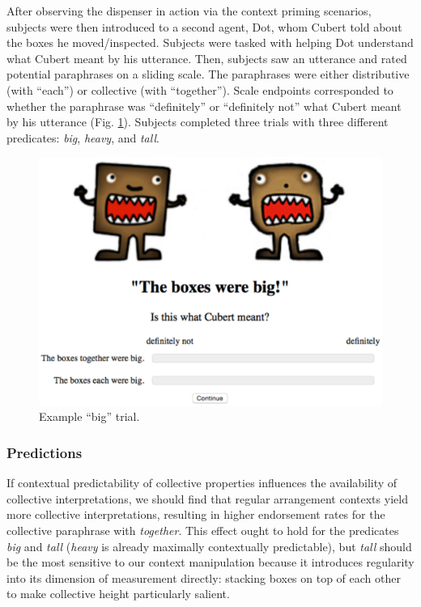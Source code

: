 \documentclass[linguex]{sp}
\begin{document}
After observing the dispenser in action via the context priming scenarios, subjects were then introduced to a second agent, Dot, whom Cubert told about the boxes he moved/inspected. Subjects were tasked with helping Dot understand what Cubert meant by his utterance. Then, subjects saw an utterance and rated potential paraphrases on a sliding scale. The paraphrases were either distributive (with  ``each'') or collective (with ``together'').  Scale endpoints corresponded to whether the paraphrase was ``definitely'' or ``definitely not'' what Cubert meant by his utterance (Fig. \ref{trial}). Subjects completed three trials with three different predicates: \emph{big}, \emph{heavy}, and \emph{tall}.


\begin{figure}[h]
\centering
\includegraphics[width=4.5in]{images/trial.eps}
\caption{Example ``big'' trial.}\label{trial}
\end{figure}

\subsubsection{Predictions}

If contextual predictability of collective properties influences the availability of collective interpretations, we should find that regular arrangement contexts yield more collective interpretations, resulting in higher endorsement rates for the collective paraphrase with \emph{together}. This effect ought to hold for the predicates \emph{big} and \emph{tall} (\emph{heavy} is already maximally contextually predictable), but \emph{tall} should be the most sensitive to our context manipulation because it introduces regularity into its dimension of measurement directly: stacking boxes on top of each other to make collective height particularly salient.
\end{document}
